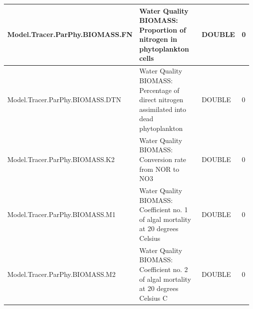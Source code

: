 \documentclass[a4paper,11pt]{article}
\begin{document}
\begin{landscape}
\begin{table}[ht]
\begin{center}
\begin{tabular}{|l|l|l|l|}
\hline Model.Tracer.ParPhy.BIOMASS.FN & Water Quality BIOMASS: Proportion of nitrogen in phytoplankton cells & DOUBLE & 0 \\
\hline Model.Tracer.ParPhy.BIOMASS.DTN & Water Quality BIOMASS: Percentage of direct nitrogen assimilated into dead phytoplankton & DOUBLE & 0 \\
\hline Model.Tracer.ParPhy.BIOMASS.K2 & Water Quality BIOMASS: Conversion rate from NOR to NO3 & DOUBLE & 0 \\
\hline Model.Tracer.ParPhy.BIOMASS.M1 & Water Quality BIOMASS: Coefficient no. 1 of algal mortality at 20 degrees Celsius & DOUBLE & 0 \\
\hline Model.Tracer.ParPhy.BIOMASS.M2 & Water Quality BIOMASS: Coefficient no. 2 of algal mortality at 20 degrees Celsius C & DOUBLE & 0 \\
\hline 
\end{tabular} 
\end{center}
\end{table}

\begin{table}[ht]
\begin{center}
\begin{tabular}{|l|l|l|l|}


\end{tabular}
\end{center}
\end{table}
\end{landscape}
\end{document}
